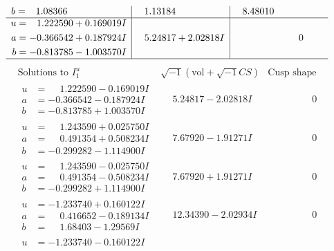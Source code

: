 \documentclass[1p]{elsarticle_modified}
\theoremstyle{definition}
\newcommand{\I}{\sqrt{-1}}
\begin{document}
$$\begin{array}{c|c|c}
\begin{aligned}
b &= \phantom{-}1.08366\phantom{ +0.000000I}\end{aligned}
 & \phantom{-}1.13184\phantom{ +0.000000I} & \phantom{-}8.48010\phantom{ +0.000000I} \\ \hline\begin{aligned}
u &= \phantom{-}1.222590 + 0.169019 I \\
a &= -0.366542 + 0.187924 I \\
b &= -0.813785 - 1.003570 I\end{aligned}
 & \phantom{-}5.24817 + 2.02818 I & \phantom{-0.000000 } 0\\
 \hline 
 \end{array}$$\newpage$$\begin{array}{c|c|c}  
\text{Solutions to }I^u_{1}& \I (\text{vol} + \sqrt{-1}CS) & \text{Cusp shape}\\
 \hline 
\begin{aligned}
u &= \phantom{-}1.222590 - 0.169019 I \\
a &= -0.366542 - 0.187924 I \\
b &= -0.813785 + 1.003570 I\end{aligned}
 & \phantom{-}5.24817 - 2.02818 I & \phantom{-0.000000 } 0 \\ \hline\begin{aligned}
u &= \phantom{-}1.243590 + 0.025750 I \\
a &= \phantom{-}0.491354 + 0.508234 I \\
b &= -0.299282 - 1.114900 I\end{aligned}
 & \phantom{-}7.67920 - 1.91271 I & \phantom{-0.000000 } 0 \\ \hline\begin{aligned}
u &= \phantom{-}1.243590 - 0.025750 I \\
a &= \phantom{-}0.491354 - 0.508234 I \\
b &= -0.299282 + 1.114900 I\end{aligned}
 & \phantom{-}7.67920 + 1.91271 I & \phantom{-0.000000 } 0 \\ \hline\begin{aligned}
u &= -1.233740 + 0.160122 I \\
a &= \phantom{-}0.416652 - 0.189134 I \\
b &= \phantom{-}1.68403 - 1.29569 I\end{aligned}
 & \phantom{-}12.34390 - 2.02934 I & \phantom{-0.000000 } 0 \\ \hline\begin{aligned}
u &= -1.233740 - 0.160122 I \\

\end{aligned}
\end{array}$$
\end{document}

